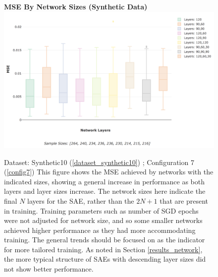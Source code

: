 \documentclass[a4paper,11pt,oneside]{article}
\theoremstyle{plain}
\theoremstyle{definition}
\begin{document}
	\begin{figure}[H]
		\centering 
		\textbf{MSE By Network Sizes (Synthetic Data)}
		\includegraphics[scale=0.25]{images/results/network/synth_mse_box.png} 
		\caption[MSE By Network Sizes (Synthetic Data)]{Dataset: Synthetic10 (\ref{dataset_synthetic10}) ; Configuration 7 (\ref{config7})
			\newline This figure shows the MSE achieved by networks with the indicated sizes, showing a general increase in performance as both layers and layer sizes increase. The network sizes here indicate the final $N$ layers for the SAE, rather than the $2N + 1$ that are present in training. Training parameters such as number of SGD epochs were not adjusted for network size, and so some smaller networks achieved higher performance as they had more accommodating training. The general trends should be focused on as the indicator for more tailored training. As noted in Section \ref{results_network}, the more typical structure of SAEs with descending layer sizes did not show better performance.}
		\label{figure-synth_mse_box}
	\end{figure}
	
\end{document}
